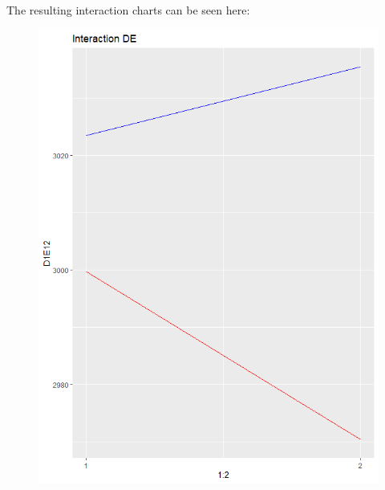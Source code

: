 The resulting interaction charts can be seen here:
\begin{figure}[H] 
	\begin{minipage}[b]{0.33\linewidth}
		\centering
		\includegraphics[width=1\linewidth]{simulations/taguchi/plots/interaction_de} 
	\end{minipage}%
	\begin{minipage}[b]{0.33\linewidth}
		\centering

\end{minipage}
\end{figure}
